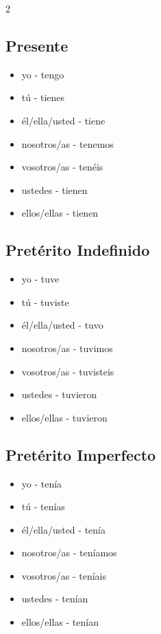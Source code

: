 \documentclass[12pt,a4paper]{article}
\begin{document}
\begin{multicols}{2}

\subsection*{Presente}
\begin{itemize}[leftmargin=*]
    \item yo - tengo
    \item tú - tienes
    \item él/ella/usted - tiene
    \item nosotros/as - tenemos
    \item vosotros/as - tenéis
    \item ustedes - tienen
    \item ellos/ellas - tienen
\end{itemize}

\subsection*{Pretérito Indefinido}
\begin{itemize}[leftmargin=*]
    \item yo - tuve
    \item tú - tuviste
    \item él/ella/usted - tuvo
    \item nosotros/as - tuvimos
    \item vosotros/as - tuvisteis
    \item ustedes - tuvieron
    \item ellos/ellas - tuvieron
\end{itemize}

\subsection*{Pretérito Imperfecto}
\begin{itemize}[leftmargin=*]
    \item yo - tenía
    \item tú - tenías
    \item él/ella/usted - tenía
    \item nosotros/as - teníamos
    \item vosotros/as - teníais
    \item ustedes - tenían
    \item ellos/ellas - tenían
\end{itemize}


\end{multicols}
\end{document}
